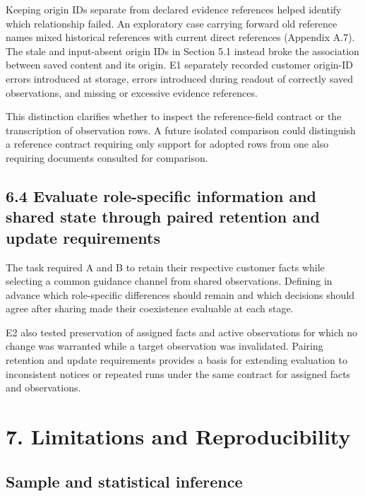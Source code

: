 \documentclass[10pt,a4paper]{article}
\begin{document}
Keeping origin IDs separate from declared evidence references helped identify which relationship failed. An exploratory case carrying forward old reference names mixed historical references with current direct references (Appendix A.7). The stale and input-absent origin IDs in Section 5.1 instead broke the association between saved content and its origin. E1 separately recorded customer origin-ID errors introduced at storage, errors introduced during readout of correctly saved observations, and missing or excessive evidence references.

This distinction clarifies whether to inspect the reference-field contract or the transcription of observation rows. A future isolated comparison could distinguish a reference contract requiring only support for adopted rows from one also requiring documents consulted for comparison.

\subsection{6.4 Evaluate role-specific information and shared state through paired retention and update requirements}\label{paper-01-evaluate-role-specific-information-and-shared-state-through-paired-retention-and-update-requirements}

The task required A and B to retain their respective customer facts while selecting a common guidance channel from shared observations. Defining in advance which role-specific differences should remain and which decisions should agree after sharing made their coexistence evaluable at each stage.

E2 also tested preservation of assigned facts and active observations for which no change was warranted while a target observation was invalidated. Pairing retention and update requirements provides a basis for extending evaluation to inconsistent notices or repeated runs under the same contract for assigned facts and observations.

\section{7. Limitations and Reproducibility}\label{paper-01-limitations-and-reproducibility}

\subsection{Sample and statistical inference}\label{paper-01-sample-and-statistical-inference}
\end{document}
